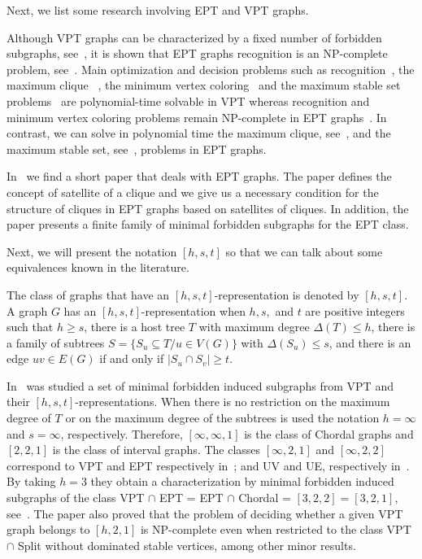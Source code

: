 Next, we list some research involving EPT and VPT graphs.

Although VPT graphs can be characterized by a fixed number of forbidden subgraphs, see~\cite{leveque2009characterizing}, it is shown that EPT graphs recognition is an NP-complete problem, see~\cite{golumbic1985}. Main optimization and decision problems such as recognition~\cite{gavril1978recognition}, the maximum clique~\cite{gavril2000maximum} , the minimum vertex coloring~\cite{golumbic2004algorithmic}  and the maximum stable set problems~\cite{spinrad1995algorithms} are polynomial-time solvable in VPT whereas recognition and minimum vertex coloring problems remain NP-complete in EPT graphs~\cite{golumbic1985edge}. In contrast, we can solve in polynomial time the maximum clique,
see~\cite{golumbic1985}, and the maximum stable set, see~\cite{tarjan1985decomposition},  problems in EPT graphs. 

In~\citet{alcon2010necessary} we find a short paper that deals with EPT graphs. The paper defines the concept of satellite of a clique and we give us a necessary condition for the  structure of cliques in EPT graphs based on satellites of cliques. In addition, the paper presents a finite family of minimal forbidden subgraphs for the EPT class.

Next, we will present the notation $[h,s,t]$ so that we can talk about some equivalences known in the literature.


The class of graphs that have an $[h,s,t]$-representation is denoted by $[h,s,t]$. A graph $G$ has an $[h,s,t]$-representation  when $h,s,$ and $t$ are positive integers such that $h \geq s$, there is a host tree $T$ with maximum degree $\Delta(T) \leq h$, there is a family of subtrees $S = \{S_u \subseteq T / u\in V(G) \}$ with $\Delta(S_u)\leq s$, and there is an edge $uv \in E(G)$ if and only if $|S_u \cap S_v|\geq t$.    

In~\citet{alcon2015characterizing} was studied a set of minimal forbidden induced subgraphs from VPT and their $[h,s,t]$-representations.
When there is no restriction on the maximum degree of $T$ or on the maximum degree of the subtrees is used the notation $h=\infty $  and $s=\infty$,  respectively. Therefore, $[\infty, \infty, 1]$ is the class of Chordal graphs and $[2, 2, 1]$ is the class of interval graphs. The classes $[\infty, 2, 1]$ and $[\infty, 2, 2]$ correspond to VPT and EPT respectively in~\cite{golumbic1985edge}; and UV and UE, respectively in~\cite{monma1986intersection}.
By taking $h=3$ they obtain a characterization by minimal forbidden induced subgraphs of the class VPT $\cap$ EPT = EPT $\cap$ Chordal = $[3,2,2] = [3,2,1]$, see~\citet{golumbic1985edge}. The paper also proved that the problem of deciding whether a given VPT graph belongs to $[h,2,1]$ is NP-complete even when restricted to the class VPT $ \cap $ Split without dominated stable vertices, among other minor results.


